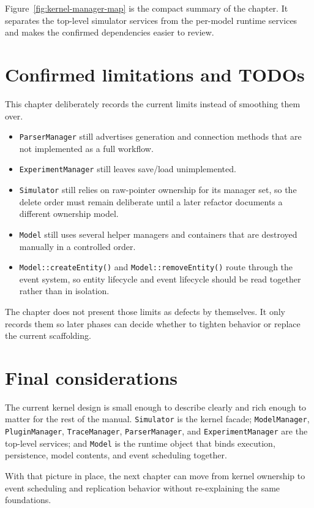 Figure~\ref{fig:kernel-manager-map} is the compact summary of the chapter. It
separates the top-level simulator services from the per-model runtime services
and makes the confirmed dependencies easier to review.

\section{Confirmed limitations and TODOs}
\label{sec:kernel-limitations}

This chapter deliberately records the current limits instead of smoothing them
over.
\begin{itemize}
\item \texttt{ParserManager} still advertises generation and connection methods
that are not implemented as a full workflow.
\item \texttt{ExperimentManager} still leaves save/load unimplemented.
\item \texttt{Simulator} still relies on raw-pointer ownership for its manager
set, so the delete order must remain deliberate until a later refactor
documents a different ownership model.
\item \texttt{Model} still uses several helper managers and containers that are
destroyed manually in a controlled order.
\item \texttt{Model::createEntity()} and \texttt{Model::removeEntity()} route
through the event system, so entity lifecycle and event lifecycle should be
read together rather than in isolation.
\end{itemize}

The chapter does not present those limits as defects by themselves. It only
records them so later phases can decide whether to tighten behavior or replace
the current scaffolding.

\section{Final considerations}
\label{sec:kernel-final-considerations}

The current kernel design is small enough to describe clearly and rich enough
to matter for the rest of the manual. \texttt{Simulator} is the kernel facade;
\texttt{ModelManager}, \texttt{PluginManager}, \texttt{TraceManager},
\texttt{ParserManager}, and \texttt{ExperimentManager} are the top-level
services; and \texttt{Model} is the runtime object that binds execution,
persistence, model contents, and event scheduling together.

With that picture in place, the next chapter can move from kernel ownership to
event scheduling and replication behavior without re-explaining the same
foundations.
